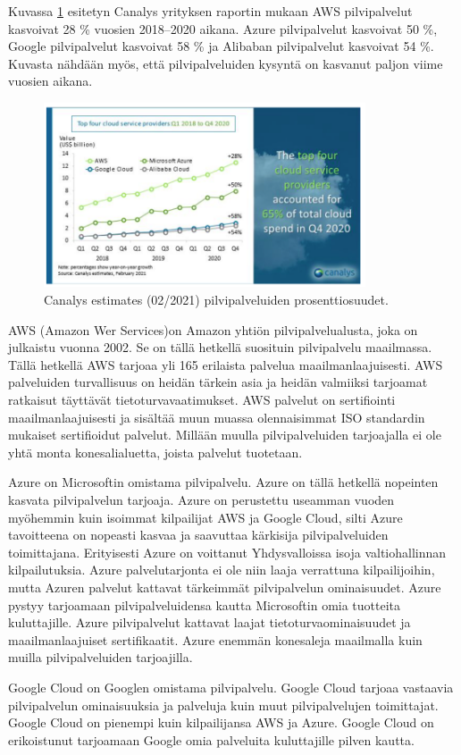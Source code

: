 Kuvassa \ref{canalys} esitetyn Canalys yrityksen raportin mukaan AWS pilvipalvelut kasvoivat 28 \% vuosien 2018–2020 aikana. Azure pilvipalvelut kasvoivat 50 \%, Google pilvipalvelut kasvoivat 58 \% ja Alibaban pilvipalvelut kasvoivat 54 \%. Kuvasta nähdään myös, että pilvipalveluiden kysyntä on kasvanut paljon viime vuosien aikana.

\begin{figure}[ht]
\centering 
\includegraphics[width=0.85\textwidth]{figures/Canalys.png}
\caption{Canalys estimates (02/2021) pilvipalveluiden prosenttiosuudet. \citep{top_cloud}}\label{canalys}
\end{figure}

AWS (Amazon Wer Services)on Amazon yhtiön pilvipalvelualusta, joka on julkaistu vuonna 2002. Se on tällä hetkellä suosituin pilvipalvelu maailmassa. Tällä hetkellä AWS tarjoaa yli 165 erilaista palvelua maailmanlaajuisesti. AWS palveluiden turvallisuus on heidän tärkein asia ja heidän valmiiksi tarjoamat ratkaisut täyttävät tietoturvavaatimukset. AWS palvelut on sertifiointi maailmanlaajuisesti ja sisältää muun muassa olennaisimmat ISO standardin mukaiset sertifioidut palvelut. Millään muulla pilvipalveluiden tarjoajalla ei ole yhtä monta konesalialuetta, joista palvelut tuotetaan.\citep{top_cloud}

Azure on Microsoftin omistama pilvipalvelu. Azure on tällä hetkellä nopeinten kasvata pilvipalvelun tarjoaja. Azure on perustettu useamman vuoden myöhemmin kuin isoimmat kilpailijat AWS ja Google Cloud, silti Azure tavoitteena on nopeasti kasvaa ja saavuttaa kärkisija pilvipalveluiden toimittajana. Erityisesti Azure on voittanut Yhdysvalloissa isoja valtiohallinnan kilpailutuksia. Azure palvelutarjonta ei ole niin laaja verrattuna kilpailijoihin, mutta Azuren palvelut kattavat tärkeimmät pilvipalvelun ominaisuudet. Azure pystyy tarjoamaan pilvipalveluidensa kautta Microsoftin omia tuotteita kuluttajille. Azure pilvipalvelut kattavat laajat tietoturvaominaisuudet ja maailmanlaajuiset sertifikaatit. Azure enemmän konesaleja maailmalla kuin muilla pilvipalveluiden tarjoajilla.\citep{top_cloud}

Google Cloud on Googlen omistama pilvipalvelu. Google Cloud tarjoaa vastaavia pilvipalvelun ominaisuuksia ja palveluja kuin muut pilvipalvelujen toimittajat. Google Cloud on pienempi kuin kilpailijansa AWS ja Azure. Google Cloud on erikoistunut tarjoamaan Google omia palveluita kuluttajille pilven kautta.\citep{top_cloud}
